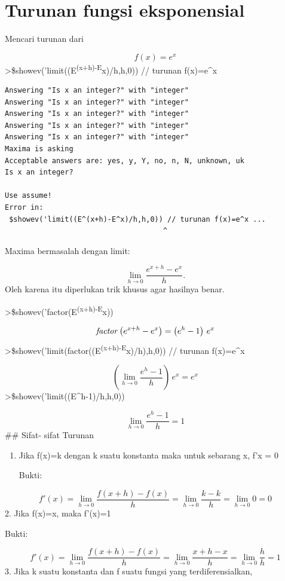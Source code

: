 \documentclass[
]{book}
\begin{document}
\section{Turunan fungsi eksponensial}\label{turunan-fungsi-eksponensial}

Mencari turunan dari

\[f(x)=e^x\]\textgreater\$showev('limit((E\textsuperscript{(x+h)-E}x)/h,h,0)) // turunan f(x)=e\^{}x

\begin{verbatim}
Answering "Is x an integer?" with "integer"
Answering "Is x an integer?" with "integer"
Answering "Is x an integer?" with "integer"
Answering "Is x an integer?" with "integer"
Answering "Is x an integer?" with "integer"
Maxima is asking
Acceptable answers are: yes, y, Y, no, n, N, unknown, uk
Is x an integer?

Use assume!
Error in:
 $showev('limit((E^(x+h)-E^x)/h,h,0)) // turunan f(x)=e^x ...
                                     ^
\end{verbatim}

Maxima bermasalah dengan limit:

\[\lim_{h\to 0}\frac{e^{x+h}-e^x}{h}.\]Oleh karena itu diperlukan trik khusus agar hasilnya benar.

\textgreater\$showev('factor(E\textsuperscript{(x+h)-E}x))

\[{\it factor}\left(e^{x+h}-e^{x}\right)=\left(e^{h}-1\right)\,e^{x}\]\textgreater\$showev('limit(factor((E\textsuperscript{(x+h)-E}x)/h),h,0)) // turunan f(x)=e\^{}x

\[\left(\lim_{h\rightarrow 0}{\frac{e^{h}-1}{h}}\right)\,e^{x}=e^{x}\]\textgreater\$showev('limit((E\^{}h-1)/h,h,0))

\[\lim_{h\rightarrow 0}{\frac{e^{h}-1}{h}}=1\]\#\# Sifat- sifat Turunan

\begin{enumerate}
\def\labelenumi{\arabic{enumi}.}
\item
  Jika f(x)=k dengan k suatu konstanta maka untuk sebarang x, f'x = 0

  Bukti:
\end{enumerate}

\[f'(x)= \lim_{h\to 0}\frac{f(x+h)-f(x)}{h} = \lim_{h\to 0}\frac{k-k}{h} = \lim_{h\to 0}0=0\]2. Jika f(x)=x, maka f'(x)=1

Bukti:

\[f'(x)= \lim_{h\to 0}\frac{f(x+h)-f(x)}{h} = \lim_{h\to 0}\frac{x+h-x}{h}=\lim_{h\to 0}\frac {h}{h}=1\]3. Jika k suatu konstanta dan f suatu fungsi yang terdiferensialkan,
\end{document}
